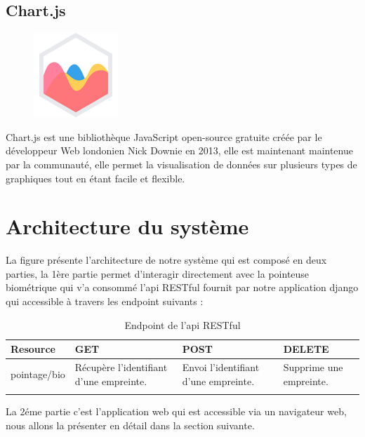 \subsection{Chart.js}
    \begin{figure}
        \vspace{-22pt}
        \begin{center}
            \includegraphics[scale=0.36]{images/logo/chartjs.png}
            \label{fig83}
        \end{center}
        \vspace{-20pt}
        \vspace{-10pt}
    \end{figure}
Chart.js est une bibliothèque JavaScript open-source gratuite créée par le 
développeur Web londonien Nick Downie en 2013, elle est maintenant maintenue par 
la communauté, elle permet la visualisation de données sur plusieurs types de 
graphiques tout en étant facile et flexible\cite{29}.
        
\section{Architecture du système} 
La figure présente l’architecture de notre système qui est composé en deux 
parties, la 1ère partie permet d’interagir directement avec la pointeuse 
biométrique qui v’a consommé l’api RESTful fournit par notre application 
django qui accessible à travers les endpoint suivants : 

\begin{longtable}{|p{2.5cm}|p{4.5cm}|p{4.5cm}|p{4.5cm}|}
    \endhead
    \endfoot
    \hline
    Resource & GET & POST & DELETE \\
    \hline
    pointage/bio & Récupère l'identifiant d'une empreinte. & Envoi l'identifiant d'une empreinte. & Supprime une empreinte.
    \\
    \hline
    \caption{Endpoint de l'api RESTful}\\
\end{longtable}

La 2éme partie c’est l’application web qui est accessible via un navigateur web, 
nous allons la présenter en détail dans la section suivante.

